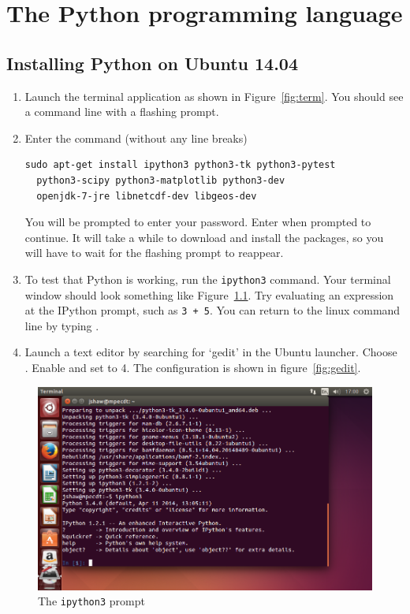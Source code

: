 \documentclass[a4paper,twoside,titlepage]{memoir}
\newcommand{\shellcmd}{\texttt}
\begin{document}
\chapter{The Python programming language}

\section{Installing Python on Ubuntu 14.04}
\label{sec:installation}

\begin{enumerate}
\item Launch the terminal application as shown in Figure~\ref{fig:term}.  You should see a command line with a flashing prompt.
\item Enter the command (without any line breaks)
\begin{verbatim}
sudo apt-get install ipython3 python3-tk python3-pytest
  python3-scipy python3-matplotlib python3-dev
  openjdk-7-jre libnetcdf-dev libgeos-dev
\end{verbatim}
You will be prompted to enter your password.  Enter  when prompted to continue.  It will take a while to download and install the packages, so you will have to wait for the flashing prompt to reappear.
\item To test that Python is working, run the \shellcmd{ipython3} command.  Your terminal window should look something like Figure~\ref{fig:ipython3}.  Try evaluating an expression at the IPython prompt, such as \shellcmd{3 + 5}.  You can return to the linux command line by typing .
\item Launch a text editor by searching for `gedit' in the Ubuntu launcher.  Choose .  Enable  and set  to 4.  The configuration is shown in figure~\ref{fig:gedit}.
\end{enumerate}

\begin{figure}
	\includegraphics[width=\textwidth]{ipython3.png}
	\caption{The \shellcmd{ipython3} prompt}
	\label{fig:ipython3}
\end{figure}
\end{document}
